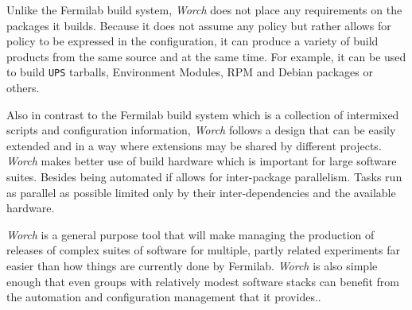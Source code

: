 \documentclass[usletter]{article}
\newcommand{\code}[1]{\texttt{#1}}
\newcommand{\worch}{\textit{Worch}\xspace}
\newcommand{\ups}{\code{UPS}\xspace}
\begin{document}
Unlike the Fermilab build system, \worch does not place any
requirements on the packages it builds.  Because it does not assume
any policy but rather allows for policy to be expressed in the
configuration, it can produce a variety of build products from the
same source and at the same time.  For example, it can be used to
build \ups tarballs, Environment Modules, RPM and Debian packages or
others.


Also in contrast to the Fermilab build system which is a  collection
of intermixed scripts and configuration information, \worch follows a
design that can be easily extended and in a way where extensions may
be shared by different projects.  \worch makes better use of build
hardware which is important for large software suites.  Besides being
automated if allows for inter-package parallelism.  Tasks run as
parallel as possible limited only by their inter-dependencies and the
available hardware.


\worch is a general purpose tool that will make managing the production
of releases of complex suites of software for multiple, partly related
experiments far easier than how things are currently done by Fermilab.
\worch is also simple enough that even groups with relatively modest
software stacks can benefit from the automation and configuration
management that it provides..
\end{document}
